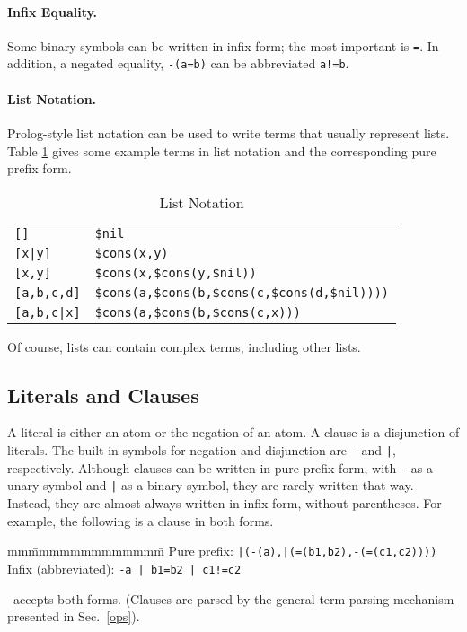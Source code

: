 \documentclass[11pt]{article}
\begin{document}
\paragraph{Infix Equality.}  Some binary symbols can be written in
infix form; the most important is \verb:=:.  In addition, a negated
equality, \verb:-(a=b): can be abbreviated \verb:a!=b:.

\paragraph{List Notation.} Prolog-style list notation can be used
to write terms that usually represent lists.  Table \ref{list-tab} gives
some example terms in list notation and the corresponding pure prefix form.
\begin{table}[htbp] \centering \small
\caption{List Notation}  \label{list-tab}
\begin{tabular}{ll}
\hline
\verb:[]:          &  \verb:$nil: \\
\verb:[x|y]:       &  \verb:$cons(x,y): \\
\verb:[x,y]:       &  \verb:$cons(x,$cons(y,$nil)): \\
\verb:[a,b,c,d]:   &  \verb:$cons(a,$cons(b,$cons(c,$cons(d,$nil)))): \\
\verb:[a,b,c|x]:   &  \verb:$cons(a,$cons(b,$cons(c,x))): \\
\hline
\end{tabular}
\end{table}
Of course, lists can contain complex terms, including other lists.

\subsection{Literals and Clauses}

A literal is either an atom or the negation of an atom.
A clause is a disjunction of literals.
The built-in symbols for negation and disjunction are \verb:-: and \verb:|:,
respectively.
Although clauses can be written in pure prefix form, with \verb:-: as a
unary symbol and \verb:|: as a binary symbol, they are rarely written
that way.  Instead, they are almost always written in infix form, without
parentheses.  For example, the following is a clause in both forms.
\begin{tabbing}
mm\=mmmmmmmmmmmmm\=\kill
\>Pure prefix:         \>  \verb:|(-(a),|(=(b1,b2),-(=(c1,c2)))):\\
\>Infix (abbreviated): \> \verb:-a | b1=b2 | c1!=c2:
\end{tabbing}
\otter\ accepts both forms.  (Clauses are parsed by the general term-parsing
mechanism presented in Sec.~\ref{ops}).
\end{document}

